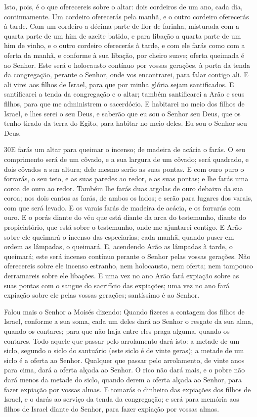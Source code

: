 Isto, pois, é o que oferecereis sobre o altar: dois cordeiros de
um ano, cada dia, continuamente. Um cordeiro oferecerás pela
manhã, e o outro cordeiro oferecerás à tarde. Com um cordeiro
a décima parte de flor de farinha, misturada com a quarta parte de
um him de azeite batido, e para libação a quarta parte de um him de
vinho, e o outro cordeiro oferecerás à tarde, e com ele farás
como com a oferta da manhã, e conforme à sua libação, por cheiro
suave; oferta queimada é ao Senhor. Este será o holocausto
contínuo por vossas gerações, à porta da tenda da congregação,
perante o Senhor, onde vos encontrarei, para falar contigo ali.
E ali virei aos filhos de Israel, para que por minha glória
sejam santificados. E santificarei a tenda da congregação e o
altar; também santificarei a Arão e seus filhos, para que me
administrem o sacerdócio. E habitarei no meio dos filhos de
Israel, e lhes serei o seu Deus, e saberão que eu sou o
Senhor seu Deus, que os tenho tirado da terra do Egito, para habitar
no meio deles. Eu sou o Senhor seu Deus.

\medskip

\lettrine{30} E farás um altar para queimar o incenso; de
madeira de acácia o farás. O seu comprimento será de um côvado,
e a sua largura de um côvado; será quadrado, e dois côvados a sua
altura; dele mesmo serão as suas pontas. E com ouro puro o
forrarás, o seu teto, e as suas paredes ao redor, e as suas pontas;
e lhe farás uma coroa de ouro ao redor. Também lhe farás duas
argolas de ouro debaixo da sua coroa; nos dois cantos as farás, de
ambos os lados; e serão para lugares dos varais, com que será
levado. E os varais farás de madeira de acácia, e os forrarás
com ouro. E o porás diante do véu que está diante da arca do
testemunho, diante do propiciatório, que está sobre o testemunho,
onde me ajuntarei contigo. E Arão sobre ele queimará o incenso
das especiarias; cada manhã, quando puser em ordem as lâmpadas, o
queimará. E, acendendo Arão as lâmpadas à tarde, o queimará;
este será incenso contínuo perante o Senhor pelas vossas gerações.
Não oferecereis sobre ele incenso estranho, nem holocausto, nem
oferta; nem tampouco derramareis sobre ele libações. E uma
vez no ano Arão fará expiação sobre as suas pontas com o sangue do
sacrifício das expiações; uma vez no ano fará expiação sobre ele
pelas vossas gerações; santíssimo é ao Senhor.

Falou mais o Senhor a Moisés dizendo: Quando fizeres a
contagem dos filhos de Israel, conforme a sua soma, cada um deles
dará ao Senhor o resgate da sua alma, quando os contares; para que
não haja entre eles praga alguma, quando os contares. Todo
aquele que passar pelo arrolamento dará isto: a metade de um siclo,
segundo o siclo do santuário (este siclo é de vinte geras); a metade
de um siclo é a oferta ao Senhor. Qualquer que passar pelo
arrolamento, de vinte anos para cima, dará a oferta alçada ao
Senhor. O rico não dará mais, e o pobre não dará menos da
metade do siclo, quando derem a oferta alçada ao Senhor, para fazer
expiação por vossas almas. E tomarás o dinheiro das expiações
dos filhos de Israel, e o darás ao serviço da tenda da congregação;
e será para memória aos filhos de Israel diante do Senhor, para
fazer expiação por vossas almas.

